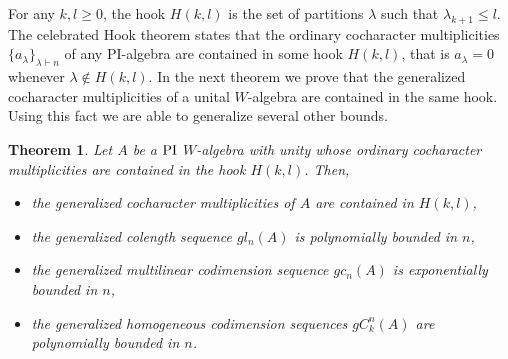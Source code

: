 \documentclass{article}
\newtheorem{theorem}{Theorem}[section]
\DeclareMathOperator{\Polid}{\textnormal{PI}}
\begin{document}
For any $k,l\geq0$, the hook $H(k,l)$ is the set of partitions $\lambda$ such that $\lambda_{k+1}\leq l$.
The celebrated Hook theorem \cite{AR82} states that the ordinary cocharacter multiplicities $\{a_\lambda\}_{\lambda\vdash n}$ of any PI-algebra are contained in some hook $H(k,l)$, that is $a_\lambda=0$ whenever $\lambda\notin H(k,l)$. In the next theorem we prove that the generalized cocharacter multiplicities of a unital $W$-algebra are contained in the same hook. Using this fact we are able to generalize several other bounds.

\begin{theorem}\label{th: good_hook}
	Let $A$ be a $\Polid$ $W$-algebra with unity whose ordinary cocharacter multiplicities are contained in the hook $H(k,l)$. Then, \begin{itemize}
		\item the generalized cocharacter multiplicities of $A$ are contained in $H(k,l)$,
		\item the generalized colength sequence $gl_n(A)$ is polynomially bounded in $n$,
		\item the generalized multilinear codimension sequence $gc_n(A)$ is exponentially bounded in $n$,
		\item the generalized homogeneous codimension sequences $gC_k^n(A)$ are polynomially bounded in $n$.
	\end{itemize}
\end{theorem}
\end{document}
